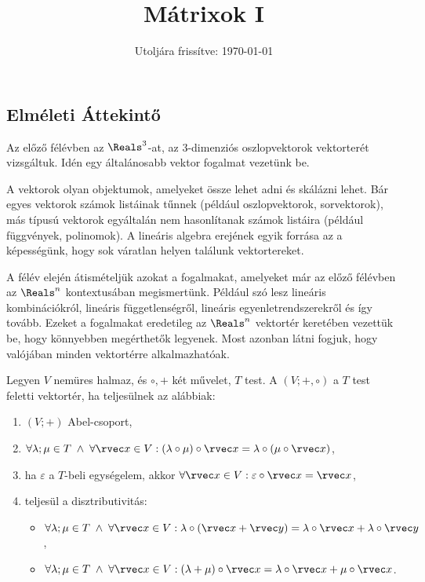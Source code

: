 \documentclass[a4paper, 12pt]{scrartcl}
\title{Mátrixok I}
\date{Utoljára frissítve: \today}
\begin{document}
\maketitle

\subsection{Elméleti Áttekintő}

\begin{blueBox}
  Az előző félévben az $\Reals^3$-at, az $3$-dimenziós oszlopvektorok
  vektorterét vizsgáltuk. Idén egy általánosabb vektor fogalmat vezetünk be.

  A vektorok olyan objektumok, amelyeket össze lehet adni és skálázni lehet.
  Bár egyes vektorok számok listáinak tűnnek (például oszlopvektorok,
  sorvektorok), más típusú vektorok egyáltalán nem hasonlítanak számok listáira
  (például függvények, polinomok). A lineáris algebra erejének egyik forrása az
  a képességünk, hogy sok váratlan helyen találunk vektortereket.

  A félév elején átismételjük azokat a fogalmakat, amelyeket már az előző
  félévben az $\Reals^n$ kontextusában megismertünk. Például szó lesz lineáris
  kombinációkról, lineáris függetlenségről, lineáris egyenletrendszerekről és
  így tovább. Ezeket a fogalmakat eredetileg az $\Reals^n$ vektortér keretében
  vezettük be, hogy könnyebben megérthetők legyenek. Most azonban látni fogjuk,
  hogy valójában minden vektortérre alkalmazhatóak.
\end{blueBox}

\begin{definition}[Vektortér]
  Legyen $V$ nemüres halmaz, és $\circ, +$ két művelet, $T$ test.
  A $(V; +, \circ)$ a $T$ test feletti vektortér, ha teljesülnek az alábbiak:
  \begin{enumerate}
    \item $(V; +)$ Abel-csoport,

    \item $\forall \lambda; \mu \in T \; \land \; \forall \rvec x \in V:
            (\lambda \circ \mu) \circ \rvec x
            = \lambda \circ (\mu \circ \rvec x)$,

    \item ha $\varepsilon$ a $T$-beli egységelem, akkor
          $\forall \rvec x \in V: \varepsilon \circ \rvec x = \rvec x$,

    \item teljesül a disztributivitás:
          \begin{itemize}
            \item $\forall \lambda; \mu \in T \; \land \; \forall \rvec x \in V:
                    \lambda \circ (\rvec x + \rvec y)
                    = \lambda \circ \rvec x + \lambda \circ \rvec y$,

            \item $\forall \lambda; \mu \in T \; \land \; \forall \rvec x \in V:
                    (\lambda + \mu) \circ \rvec x
                    = \lambda \circ \rvec x + \mu \circ \rvec x$.
          \end{itemize}
  \end{enumerate}
\end{definition}
\end{document}
